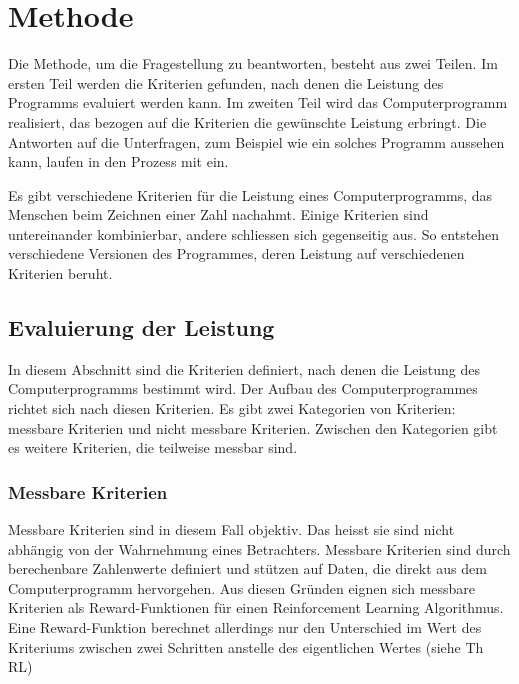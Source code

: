 \chapter{Methode}
Die Methode, um die Fragestellung zu beantworten, besteht aus zwei Teilen. Im
ersten Teil werden die Kriterien gefunden, nach denen die Leistung des Programms
evaluiert werden kann. Im zweiten Teil wird das Computerprogramm realisiert, das
bezogen auf die Kriterien die gewünschte Leistung erbringt. Die Antworten auf
die Unterfragen, zum Beispiel wie ein solches Programm aussehen kann, laufen in
den Prozess mit ein. 

Es gibt verschiedene Kriterien für die Leistung eines Computerprogramms, das
Menschen beim Zeichnen einer Zahl nachahmt. Einige Kriterien sind untereinander  %
kombinierbar, andere schliessen sich gegenseitig aus. So entstehen verschiedene
Versionen des Programmes, deren Leistung auf verschiedenen Kriterien beruht.


\section{Evaluierung der Leistung}
In diesem Abschnitt sind die Kriterien definiert, nach denen die Leistung des
Computerprogramms bestimmt wird. Der Aufbau des Computerprogrammes richtet sich
nach diesen Kriterien. Es gibt zwei Kategorien von Kriterien: messbare Kriterien
und nicht messbare Kriterien. Zwischen den Kategorien gibt es weitere Kriterien,
die teilweise messbar sind.

\subsection*{Messbare Kriterien}
Messbare Kriterien sind in diesem Fall objektiv. Das heisst sie sind nicht
abhängig von der Wahrnehmung eines Betrachters. Messbare Kriterien sind durch
berechenbare Zahlenwerte definiert und stützen auf Daten, die direkt aus dem
Computerprogramm hervorgehen. Aus diesen Gründen eignen sich messbare Kriterien
als Reward-Funktionen für einen Reinforcement Learning Algorithmus. Eine
Reward-Funktion berechnet allerdings nur den Unterschied im Wert des Kriteriums
zwischen zwei Schritten anstelle des eigentlichen Wertes (siehe Th RL)  %

